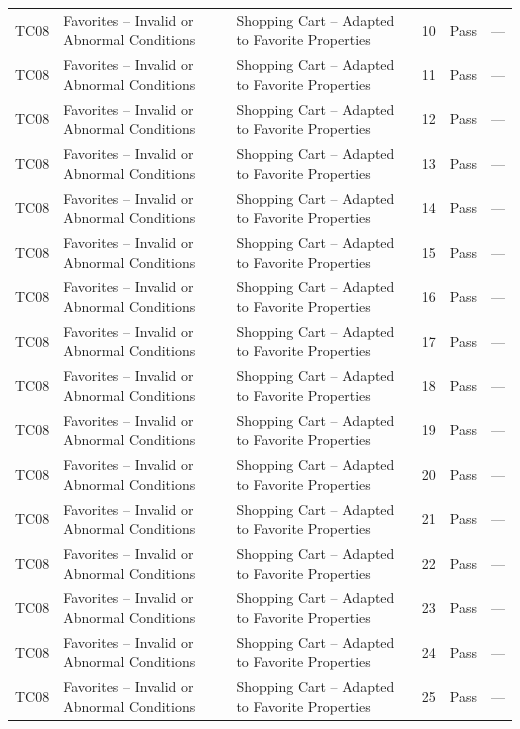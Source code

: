 {\begin{longtable}{@{}p{1.2cm} p{4.2cm} p{4.4cm} p{0.8cm} p{0.9cm} p{1.6cm}@{}}
  TC08 & Favorites -- Invalid or Abnormal Conditions & Shopping Cart -- Adapted to Favorite Properties & 10 & Pass & --- \\
  TC08 & Favorites -- Invalid or Abnormal Conditions & Shopping Cart -- Adapted to Favorite Properties & 11 & Pass & --- \\
  TC08 & Favorites -- Invalid or Abnormal Conditions & Shopping Cart -- Adapted to Favorite Properties & 12 & Pass & --- \\
  TC08 & Favorites -- Invalid or Abnormal Conditions & Shopping Cart -- Adapted to Favorite Properties & 13 & Pass & --- \\
  TC08 & Favorites -- Invalid or Abnormal Conditions & Shopping Cart -- Adapted to Favorite Properties & 14 & Pass & --- \\
  TC08 & Favorites -- Invalid or Abnormal Conditions & Shopping Cart -- Adapted to Favorite Properties & 15 & Pass & --- \\
  TC08 & Favorites -- Invalid or Abnormal Conditions & Shopping Cart -- Adapted to Favorite Properties & 16 & Pass & --- \\
  TC08 & Favorites -- Invalid or Abnormal Conditions & Shopping Cart -- Adapted to Favorite Properties & 17 & Pass & --- \\
  TC08 & Favorites -- Invalid or Abnormal Conditions & Shopping Cart -- Adapted to Favorite Properties & 18 & Pass & --- \\
  TC08 & Favorites -- Invalid or Abnormal Conditions & Shopping Cart -- Adapted to Favorite Properties & 19 & Pass & --- \\
  TC08 & Favorites -- Invalid or Abnormal Conditions & Shopping Cart -- Adapted to Favorite Properties & 20 & Pass & --- \\
  TC08 & Favorites -- Invalid or Abnormal Conditions & Shopping Cart -- Adapted to Favorite Properties & 21 & Pass & --- \\
  TC08 & Favorites -- Invalid or Abnormal Conditions & Shopping Cart -- Adapted to Favorite Properties & 22 & Pass & --- \\
  TC08 & Favorites -- Invalid or Abnormal Conditions & Shopping Cart -- Adapted to Favorite Properties & 23 & Pass & --- \\
  TC08 & Favorites -- Invalid or Abnormal Conditions & Shopping Cart -- Adapted to Favorite Properties & 24 & Pass & --- \\
  TC08 & Favorites -- Invalid or Abnormal Conditions & Shopping Cart -- Adapted to Favorite Properties & 25 & Pass & --- \\

\end{longtable}}
